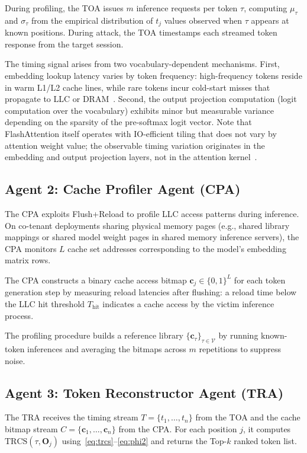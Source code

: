 \documentclass[journal,10pt,twocolumn]{IEEEtran}
\begin{document}
During profiling, the TOA issues $m$ inference requests per
token $\tau$, computing $\mu_\tau$ and $\sigma_\tau$ from the
empirical distribution of $t_j$ values observed when $\tau$
appears at known positions. During attack, the TOA timestamps
each streamed token response from the target session.

The timing signal arises from two vocabulary-dependent
mechanisms. First, embedding lookup latency varies by token
frequency: high-frequency tokens reside in warm L1/L2 cache
lines, while rare tokens incur cold-start misses that propagate
to LLC or DRAM~\cite{dao2022flashattention}. Second, the output
projection computation (logit computation over the vocabulary)
exhibits minor but measurable variance depending on the sparsity
of the pre-softmax logit vector. Note that FlashAttention
itself operates with IO-efficient tiling that does not vary
by attention weight value; the observable timing variation
originates in the embedding and output projection layers,
not in the attention kernel~\cite{dao2022flashattention}.

\subsection{Agent 2: Cache Profiler Agent (CPA)}

The CPA exploits Flush+Reload to profile LLC access patterns
during inference. On co-tenant deployments sharing physical
memory pages (e.g., shared library mappings or shared model
weight pages in shared memory inference servers), the CPA
monitors $L$ cache set addresses corresponding to the model's
embedding matrix rows.

The CPA constructs a binary cache access bitmap
$\mathbf{c}_j \in \{0,1\}^L$ for each token generation step
by measuring reload latencies after flushing: a reload time
below the LLC hit threshold $T_{\mathrm{hit}}$ indicates a
cache access by the victim inference process.

The profiling procedure builds a reference library
$\{\mathbf{c}_\tau\}_{\tau \in \mathcal{V}}$ by running
known-token inferences and averaging the bitmaps across $m$
repetitions to suppress noise.

\subsection{Agent 3: Token Reconstructor Agent (TRA)}

The TRA receives the timing stream $T = \{t_1, \ldots, t_n\}$
from the TOA and the cache bitmap stream
$C = \{\mathbf{c}_1, \ldots, \mathbf{c}_n\}$ from the CPA.
For each position $j$, it computes
$\mathrm{TRCS}(\tau, \mathbf{O}_j)$
using~\eqref{eq:trcs}--\eqref{eq:phi2} and returns
the Top-$k$ ranked token list.
\end{document}
